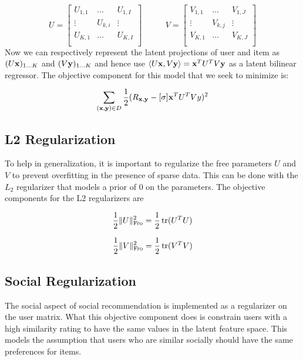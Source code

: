 \begin{equation*}
U = 
\begin{bmatrix}
  U_{1,1} & \hdots  & U_{1,I} \\
  \vdots  & U_{k,i} & \vdots  \\
  U_{K,1} & \hdots  & U_{K,I} \\
\end{bmatrix}
\qquad \; \; \;
V = 
\begin{bmatrix}
  V_{1,1} & \hdots  & V_{1,J} \\
  \vdots  & V_{k,j} & \vdots  \\
  V_{K,1} & \hdots  & V_{K,J} \\
\end{bmatrix}
\end{equation*}
Now we can respectively represent the latent projections of user and
item as $(U \mathbf{x})_{1 \ldots K}$ and $(V \mathbf{y})_{1 \ldots K}$ and
hence use $\langle U \mathbf{x}, V \mathbf{y} \rangle = \mathbf{x}^T U^T V \mathbf{y}$ as a latent bilinear regressor. The objective component for this model that we seek to minimize is:


\begin{align}
\sum_{(\mathbf{x},\mathbf{y}) \in D} \frac{1}{2} (R_{\mathbf{x},\mathbf{y}} - [\sigma] \mathbf{x}^T U^T V y)^2
\end{align}

\subsection{L2 Regularization}

To help in generalization, it is important to regularize the free parameters $U$ and $V$ to prevent overfitting in
the presence of sparse data. This can be done with the
$L_2$ regularizer that models a prior of $0$ on the parameters. The objective components for the L2 regularizers are

\[
\frac{1}{2} \| U \|_{\mathrm{Fro}}^2 = \frac{1}{2} \operatorname{tr}(U^T U)
\]

\[
\frac{1}{2} \| V \|_{\mathrm{Fro}}^2 = \frac{1}{2} \operatorname{tr}(V^T V)
\]

\subsection{Social Regularization}
The social aspect of social recommendation is implemented as a regularizer on the user matrix. What this objective component does is constrain users with a high similarity rating to have the same values in the latent feature space. This models the assumption that users who are similar socially should have the same preferences for items.

